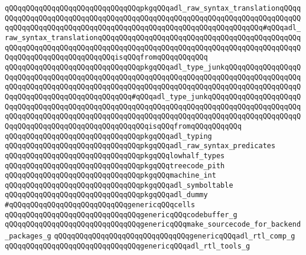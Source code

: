 \verb|qQQqqQQqqQQqqQQqqQQqqQQqqQQqqQQqpkgqQQqadl_raw_syntax_translationqQQqqQQqqQQqqQQqqQQqqQQqqQQqqQQqqQQqqQQqqQQqqQQqqQQqqQQqqQQqqQQqqQQqqQQqqQQqqQQqqQQqqQQqqQQqqQQqqQQqqQQqqQQqqQQqqQQqqQQqqQQqqQQqqQQqqQQq#qQQqadl_raw_syntax_translationqQQqqQQqqQQqqQQqqQQqqQQqqQQqqQQqqQQqqQQqqQQqqQQqqQQqqQQqqQQqqQQqqQQqqQQqqQQqqQQqqQQqqQQqqQQqqQQqqQQqqQQqqQQqqQQqqQQqqQQqqQQqqQQqqQQqqQQqqQQqqQQqisqQQqfromqQQqqQQqqQQq|\newline
\verb|qQQqqQQqqQQqqQQqqQQqqQQqqQQqqQQqpkgqQQqadl_type_junkqQQqqQQqqQQqqQQqqQQqqQQqqQQqqQQqqQQqqQQqqQQqqQQqqQQqqQQqqQQqqQQqqQQqqQQqqQQqqQQqqQQqqQQqqQQqqQQqqQQqqQQqqQQqqQQqqQQqqQQqqQQqqQQqqQQqqQQqqQQqqQQqqQQqqQQqqQQqqQQqqQQqqQQqqQQqqQQqqQQqqQQqqQQq#qQQqadl_type_junkqQQqqQQqqQQqqQQqqQQqqQQqqQQqqQQqqQQqqQQqqQQqqQQqqQQqqQQqqQQqqQQqqQQqqQQqqQQqqQQqqQQqqQQqqQQqqQQqqQQqqQQqqQQqqQQqqQQqqQQqqQQqqQQqqQQqqQQqqQQqqQQqqQQqqQQqqQQqqQQqqQQqqQQqqQQqqQQqqQQqqQQqqQQqqQQqqQQqisqQQqfromqQQqqQQqqQQq|\newline
\verb|qQQqqQQqqQQqqQQqqQQqqQQqqQQqqQQqpkgqQQqadl_typing|\newline
\verb|qQQqqQQqqQQqqQQqqQQqqQQqqQQqqQQqpkgqQQqadl_raw_syntax_predicates|\newline
\verb|qQQqqQQqqQQqqQQqqQQqqQQqqQQqqQQqpkgqQQqlowhalf_types|\newline
\verb|qQQqqQQqqQQqqQQqqQQqqQQqqQQqqQQqpkgqQQqtreecode_pith|\newline
\verb|qQQqqQQqqQQqqQQqqQQqqQQqqQQqqQQqpkgqQQqmachine_int|\newline
\verb|qQQqqQQqqQQqqQQqqQQqqQQqqQQqqQQqpkgqQQqadl_symboltable|\newline
\verb|qQQqqQQqqQQqqQQqqQQqqQQqqQQqqQQqpkgqQQqadl_dummy|\newline
\newline
\verb|#qQQqqQQqqQQqqQQqqQQqqQQqqQQqgenericqQQqcells|\newline
\verb|qQQqqQQqqQQqqQQqqQQqqQQqqQQqqQQqgenericqQQqcodebuffer_g|\newline
\verb|qQQqqQQqqQQqqQQqqQQqqQQqqQQqqQQqgenericqQQqmake_sourcecode_for_backend_packages_g|\newline
\verb|qQQqqQQqqQQqqQQqqQQqqQQqqQQqqQQqgenericqQQqadl_rtl_comp_g|\newline
\verb|qQQqqQQqqQQqqQQqqQQqqQQqqQQqqQQqgenericqQQqadl_rtl_tools_g|\newline
